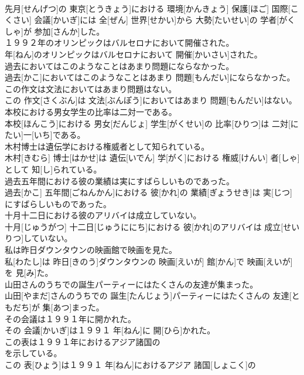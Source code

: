 \documentclass[8pt]{extreport}
\begin{document}
\begin{CJK}{UTF8}{min}
\\	先月[せんげつ]の 東京[とうきょう]における 環境[かんきょう] 保護[ほご] 国際[こくさい] 会議[かいぎ]には 全[ぜん] 世界[せかい]から 大勢[たいせい]の 学者[がくしゃ]が 参加[さんか]した。
\\	１９９２年のオリンピックはバルセロナにおいて開催された。	
\\	年[ねん]のオリンピックはバルセロナにおいて 開催[かいさい]された。
\\	過去においてはこのようなことはあまり問題にならなかった。	
\\	過去[かこ]においてはこのようなことはあまり 問題[もんだい]にならなかった。
\\	この作文は文法においてはあまり問題はない。	
\\	この 作文[さくぶん]は 文法[ぶんぽう]においてはあまり 問題[もんだい]はない。
\\	本校における男女学生の比率は二対一である。	
\\	本校[ほんこう]における 男女[だんじょ] 学生[がくせい]の 比率[ひりつ]は 二対[にたい]一[いち]である。
\\	木村博士は遺伝学における権威者として知られている。	
\\	木村[きむら] 博士[はかせ]は 遺伝[いでん] 学[がく]における 権威[けんい] 者[しゃ]として 知[し]られている。
\\	過去五年間における彼の業績は実にすばらしいものであった。	
\\	過去[かこ] 五年間[ごねんかん]における 彼[かれ]の 業績[ぎょうせき]は 実[じつ]にすばらしいものであった。
\\	十月十二日における彼のアリバイは成立していない。	
\\	十月[じゅうがつ] 十二日[じゅうににち]における 彼[かれ]のアリバイは 成立[せいりつ]していない。
\\	私は昨日ダウンタウンの映画館で映画を見た。	
\\	私[わたし]は 昨日[きのう]ダウンタウンの 映画[えいが] 館[かん]で 映画[えいが]を 見[み]た。
\\	山田さんのうちでの誕生パーティーにはたくさんの友達が集まった。	
\\	山田[やまだ]さんのうちでの 誕生[たんじょう]パーティーにはたくさんの 友達[ともだち]が 集[あつ]まった。
\\	その会議は１９９１年に開かれた。	
\\	その 会議[かいぎ]は１９９１ 年[ねん]に 開[ひら]かれた。
\\	この表は１９９１年におけるアジア諸国の
\\	を示している。	
\\	この 表[ひょう]は１９９１ 年[ねん]におけるアジア 諸国[しょこく]の 

\end{CJK}
\end{document}
